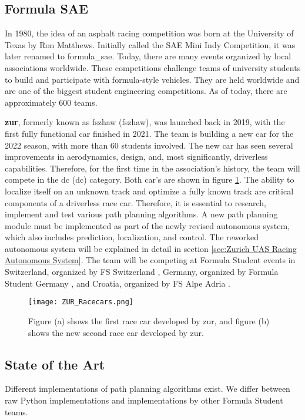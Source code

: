 \subsection{Formula SAE}
In 1980, the idea of an asphalt racing competition was born at the University of Texas by Ron Matthews. Initially called the SAE Mini Indy Competition, it was later renamed to \Gls{formula_sae}. Today, there are many events organized by local associations worldwide. \cite{formula_sae}
These competitions challenge teams of university students to build and participate with formula-style vehicles. They are held worldwide and are one of the biggest student engineering competitions. As of today, there are approximately 600 teams. \cite{sae_student_events}

\textbf{\acrlong{zur}}, formerly known as \acrlong{fszhaw} (\acrshort{fszhaw}), was launched back in 2019, with the first fully functional car finished in 2021. The team is building a new car for the 2022 season, with more than 60 students involved. The new car has seen several improvements in aerodynamics, design, and, most significantly, driverless capabilities. \cite{fszhaw_launch}
Therefore, for the first time in the association's history, the team will compete in the \acrlong{dc} (\acrshort{dc}) category. Both car's are shown in figure \ref{fig:ZUR Racecars}.
The ability to localize itself on an unknown track and optimize a fully known track are critical components of a driverless race car. Therefore, it is essential to research, implement and test various path planning algorithms. A new path planning module must be implemented as part of the newly revised autonomous system, which also includes prediction, localization, and control. The reworked autonomous system will be explained in detail in section \ref{sec:Zurich UAS Racing Autonomous System}.
The team will be competing at Formula Student events in Switzerland, organized by FS Switzerland \cite{fsswitzerland}, Germany, organized by Formula Student Germany \cite{fs_germany}, and Croatia, organized by FS Alpe Adria \cite{fs_alpe_adria}.
\begin{figure}[H]
    \centering
    \texttt{[image: ZUR\_Racecars.png]}
    \caption{Figure (a) shows the first race car developed by \acrshort{zur}, and figure (b) shows the new second race car developed by \acrshort{zur}.}
    \label{fig:ZUR Racecars}
\end{figure}

\subsection{State of the Art} \label{sec:State of the Art}
Different implementations of path planning algorithms exist. We differ between raw Python implementations and implementations by other Formula Student teams.

